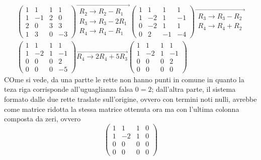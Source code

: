 \begin{equation}
  \label{eq:qualcheappgeo7}
\begin{matrix}
  \left(
    \begin{array}{ccc|c}
      1 & 1 & 1 & 1\\
      1 & -1 & 2 & 0\\
      2 & 0 & 3 & 3\\
      1 & 3 & 0 & -3
    \end{array}\right)
  \overrightarrow{
     \begin{matrix}
       R_2\to R_2-R_1\\
       R_3\to R_3-2R_1\\
       R_4\to R_4-R_1
     \end{matrix}
   }
 \left(
   \begin{array}{ccc|c}
     1 & 1 & 1 & 1 \\
     1  & -2 & 1 & -1 \\
     0  & -2 & 1 & 1 \\
     0 & 2 & -1 & -4
   \end{array}
 \right) \overrightarrow{
   \begin{matrix}
     R_3\to R_3-R_2\\
     R_4\to R_4+R_2
   \end{matrix}
}\\
\left(
  \begin{array}{ccc|c}
    1 & 1 & 1 & 1 \\
    1 & -2 & 1 & -1 \\
    0 & 0 & 0 & 2 \\
    0 & 0 & 0 & -5
  \end{array}
  \right)\overrightarrow{R_4\to 2R_4+5R_3}\left(
  \begin{array}{ccc|c}
    1 & 1 & 1 & 1 \\
    1 & -2 & 1 & -1\\
    0 & 0 & 0 & 2\\
    0 & 0 & 0 & 0
  \end{array}\right)
  \end{matrix}
\end{equation}
COme si vede, da una partte le rette non hanno punti in comune in quanto la teza riga corrisponde
all'uguaglianza falsa $0 = 2$; dall'altra parte, il sistema formato dalle due rette traslate
sull'origine, ovvero con termini noti nulli, avrebbe come matrice ridotta la stessa matrice ottenuta
ora ma con l'ultima colonna composta da zeri, ovvero
\begin{equation*}
  \left(
    \begin{array}{ccc|c}
      1 & 1 & 1 & 0 \\
      1 & -2 & 1 & 0\\
      0 & 0 & 0 & 0\\
      0 & 0 & 0 & 0
    \end{array}
  \right)
\end{equation*}
